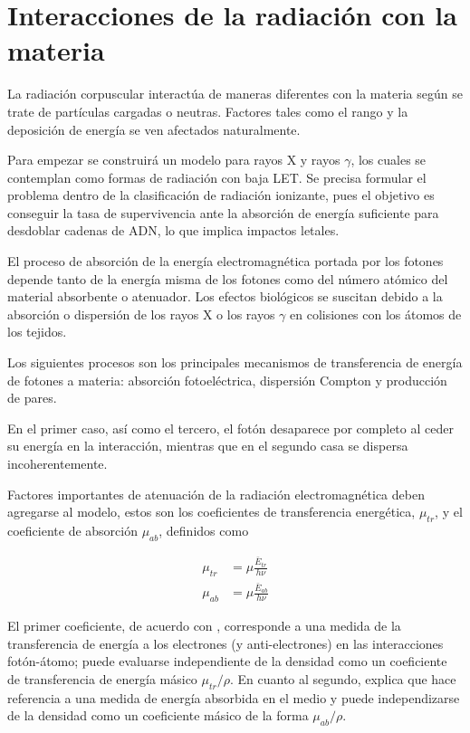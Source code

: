 \documentclass[12pt,letterpaper, oneside]{book}
\begin{document}
	\section{Interacciones de la radiación con la materia}
	La radiación corpuscular interactúa de maneras diferentes con la materia según se trate de partículas cargadas o neutras. Factores tales como el rango y la deposición de energía se ven afectados naturalmente. 
	
	Para empezar se construirá un modelo para rayos X y rayos $\gamma$, los cuales se contemplan como formas de radiación con baja LET\cite{Podgorsak.2016}. Se precisa formular el problema dentro de la clasificación de radiación ionizante, pues el objetivo es conseguir la tasa de supervivencia ante la absorción de energía suficiente para desdoblar cadenas de ADN, lo que implica impactos letales\cite{Mayles.2007, Tubiana.1990}. 
	
	El proceso de absorción de la energía electromagnética portada por los fotones depende tanto de la energía misma de los fotones como del número atómico del material absorbente o atenuador\cite{IAEA.2010, Mayles.2007}. Los efectos biológicos se suscitan debido a la absorción o dispersión de los rayos X o los rayos $\gamma$ en colisiones con los átomos de los tejidos\cite{IAEA.2010, Mayles.2007}. 
	
	Los siguientes procesos son los principales mecanismos de transferencia de energía de fotones a materia: absorción fotoeléctrica, dispersión Compton y producción de pares\cite{IAEA.2010,Podgorsak.2016}. 
	
	En el primer caso, así como el tercero, el fotón desaparece por completo al ceder su energía en la interacción, mientras que en el segundo casa se dispersa incoherentemente\cite{IAEA.2005}.
	
	Factores importantes de atenuación de la radiación electromagnética deben agregarse al modelo, estos son los coeficientes de transferencia energética, $\mu_{tr}$, y el coeficiente de absorción $\mu_{ab}$, definidos como
	
	\begin{eqnarray}
		\mu_{tr}&=\mu \frac{\bar{E}_{tr}}{h\nu}\\
		\mu_{ab}&=\mu \frac{\bar{E}_{ab}}{h\nu}
	\end{eqnarray}
	
	 \noindent El primer coeficiente, de acuerdo con \cite{Podgorsak.2016}, corresponde a una medida de la transferencia de energía a los electrones (y anti-electrones) en las interacciones fotón-átomo; puede evaluarse independiente de la densidad como un coeficiente de transferencia de energía másico $\mu_{tr}/\rho$. En cuanto al segundo, \cite{Podgorsak.2016} explica que hace referencia a una medida de energía absorbida en el medio y puede independizarse de la densidad como un coeficiente másico de la forma $\mu_{ab}/\rho$. 
	 
\end{document}
